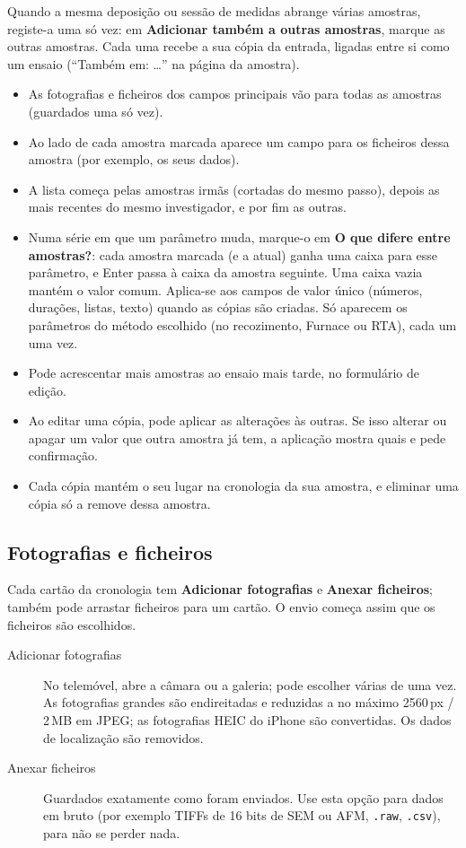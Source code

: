 \documentclass[11pt,a4paper]{article}
\newcommand{\ui}[1]{\textsf{\textbf{#1}}}
\begin{document}
Quando a mesma deposição ou sessão de medidas abrange várias amostras,
registe-a uma só vez: em \ui{Adicionar também a outras amostras}, marque
as outras amostras. Cada uma recebe a sua cópia da entrada, ligadas entre
si como um ensaio (``Também em: \ldots'' na página da amostra).

\begin{itemize}
  \item As fotografias e ficheiros dos campos principais vão para todas as
        amostras (guardados uma só vez).
  \item Ao lado de cada amostra marcada aparece um campo para os ficheiros
        dessa amostra (por exemplo, os seus dados).
  \item A lista começa pelas amostras irmãs (cortadas do mesmo passo),
        depois as mais recentes do mesmo investigador, e por fim as outras.
  \item Numa série em que um parâmetro muda, marque-o em \ui{O que difere
        entre amostras?}: cada amostra marcada (e a atual) ganha uma caixa
        para esse parâmetro, e Enter passa à caixa da amostra seguinte. Uma
        caixa vazia mantém o valor comum. Aplica-se aos campos de valor
        único (números, durações, listas, texto) quando as cópias são criadas.
        Só aparecem os parâmetros do método escolhido (no recozimento,
        Furnace ou RTA), cada um uma vez.
  \item Pode acrescentar mais amostras ao ensaio mais tarde, no formulário
        de edição.
  \item Ao editar uma cópia, pode aplicar as alterações às outras. Se isso
        alterar ou apagar um valor que outra amostra já tem, a aplicação
        mostra quais e pede confirmação.
  \item Cada cópia mantém o seu lugar na cronologia da sua amostra, e
        eliminar uma cópia só a remove dessa amostra.
\end{itemize}

\subsection{Fotografias e ficheiros}
\label{sec:files}

Cada cartão da cronologia tem \ui{Adicionar fotografias} e \ui{Anexar
ficheiros}; também pode arrastar ficheiros para um cartão. O envio começa
assim que os ficheiros são escolhidos.

\begin{description}
  \item[Adicionar fotografias] No telemóvel, abre a câmara ou a galeria;
    pode escolher várias de uma vez. As fotografias grandes são endireitadas
    e reduzidas a no máximo 2560\,px / 2\,MB em JPEG; as fotografias HEIC do
    iPhone são convertidas. Os dados de localização são removidos.
  \item[Anexar ficheiros] Guardados exatamente como foram enviados. Use
    esta opção para dados em bruto (por exemplo TIFFs de 16 bits de SEM ou
    AFM, \texttt{.raw}, \texttt{.csv}), para não se perder nada.
\end{description}
\end{document}
